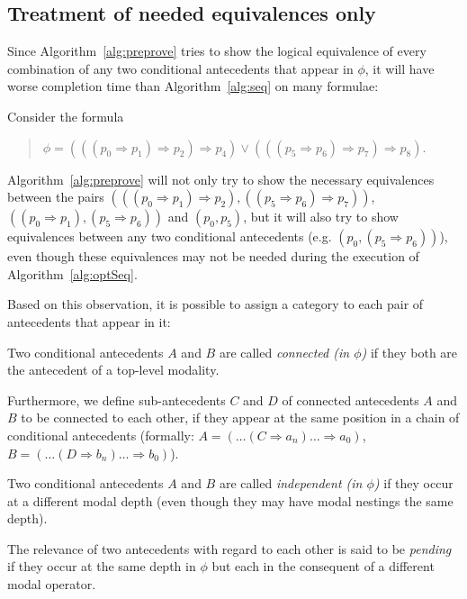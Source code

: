 \documentclass{entcs} \usepackage{entcsmacro}
\begin{document}
\subsection{Treatment of needed equivalences only}

Since Algorithm~\ref{alg:preprove} tries to show the logical equivalence of every combination
of any two conditional antecedents that appear in $\phi$, it will have worse completion
time than Algorithm~\ref{alg:seq} on many formulae:

\begin{example}
Consider the formula 
\begin{quote}
$\phi=(((p_0\Rightarrow p_1)\Rightarrow p_2)\Rightarrow p_4)\vee
(((p_5\Rightarrow p_6)\Rightarrow p_7)\Rightarrow p_8)$.
\end{quote}
Algorithm~\ref{alg:preprove} will not only
try to show the necessary equivalences between the pairs
$(((p_0\Rightarrow p_1)\Rightarrow p_2), ((p_5\Rightarrow p_6)\Rightarrow p_7))$,
$((p_0\Rightarrow p_1), (p_5\Rightarrow p_6))$ and $(p_0,p_5)$, but it will
also try to show equivalences between any two conditional antecedents (e.g. $(p_0,
(p_5\Rightarrow p_6))$), even though these equivalences may not be needed
during the execution of Algorithm~\ref{alg:optSeq}.
\end{example}

Based on this observation, it is possible to assign a category to each pair of
antecedents that appear in it:

\begin{definition}
Two conditional antecedents $A$ and $B$ are called \emph{connected (in $\phi$)} if
they both are the antecedent of a top-level modality.

Furthermore, we define sub-antecedents $C$ and $D$ of connected antecedents $A$ and $B$
to be connected to each other, if they appear at the same position in a chain
of conditional antecedents (formally: $A=(\ldots(C\Rightarrow a_n)\ldots \Rightarrow a_0)$,
$B=(\ldots(D\Rightarrow b_n)\ldots \Rightarrow b_0)$).

Two conditional antecedents $A$ and $B$ are called \emph{independent (in $\phi$)} if
they occur at a different modal depth (even though they may have modal nestings the same depth).

The relevance of two antecedents with regard to each other is said to be
\emph{pending} if they occur at the same depth in $\phi$ but each
in the consequent of a different modal operator.
\end{definition}
\end{document}
